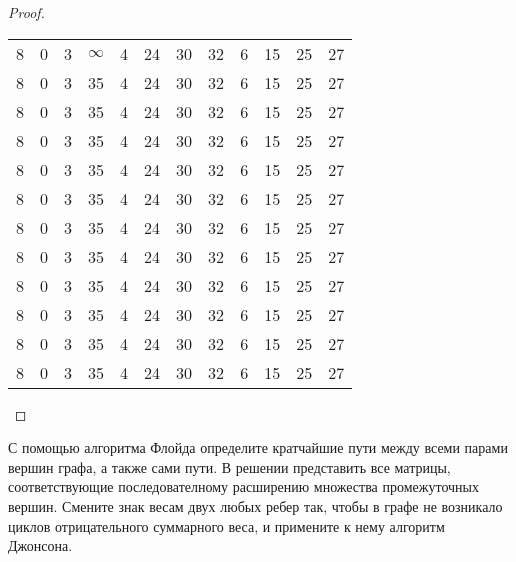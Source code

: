 \begin{proof}
\begin{tabular}{c|c|c|c|c|c|c|c|c|c|c|c}
8 & 0 & 3 & $\infty$ & 4 & 24 & 30 & 32 & 6 & 15 & 25 & 27 \\
8 & 0 & 3 & 35 & 4 & 24 & 30 & 32 & 6 & 15 & 25 & 27 \\
8 & 0 & 3 & 35 & 4 & 24 & 30 & 32 & 6 & 15 & 25 & 27 \\
8 & 0 & 3 & 35 & 4 & 24 & 30 & 32 & 6 & 15 & 25 & 27 \\
8 & 0 & 3 & 35 & 4 & 24 & 30 & 32 & 6 & 15 & 25 & 27 \\
8 & 0 & 3 & 35 & 4 & 24 & 30 & 32 & 6 & 15 & 25 & 27 \\
8 & 0 & 3 & 35 & 4 & 24 & 30 & 32 & 6 & 15 & 25 & 27 \\
8 & 0 & 3 & 35 & 4 & 24 & 30 & 32 & 6 & 15 & 25 & 27 \\
8 & 0 & 3 & 35 & 4 & 24 & 30 & 32 & 6 & 15 & 25 & 27 \\
8 & 0 & 3 & 35 & 4 & 24 & 30 & 32 & 6 & 15 & 25 & 27 \\
8 & 0 & 3 & 35 & 4 & 24 & 30 & 32 & 6 & 15 & 25 & 27 \\
\hline
8 & 0 & 3 & 35 & 4 & 24 & 30 & 32 & 6 & 15 & 25 & 27 \\
\end{tabular}
\end{proof}

\begin{problem}
С помощью алгоритма Флойда определите кратчайшие пути между всеми парами вершин графа, а также сами пути. В решении представить все матрицы, соответствующие последователному расширению множества промежуточных вершин. Смените знак весам двух любых ребер так, чтобы в графе не возникало циклов отрицательного суммарного веса, и примените к нему алгоритм Джонсона. \\ 
\usetikzlibrary{graphs,automata,positioning}
\end{problem}

